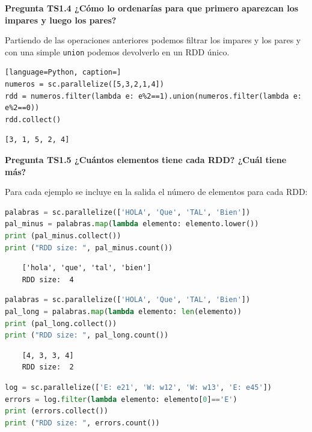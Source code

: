 \documentclass[10pt,swedish, openany]{book}
\begin{document}
\vspace{0.8em}

\textbf{Pregunta TS1.4 ¿Cómo lo ordenarías para que primero aparezcan los impares y luego los pares?}

Partiendo de las operaciones anteriores podemos filtrar los impares y los pares y con una simple \texttt{union} podemos devolverlo en un RDD único.

\begin{lstlisting}[language=Python, caption=]
numeros = sc.parallelize([5,3,2,1,4])
rdd = numeros.filter(lambda e: e%2==1).union(numeros.filter(lambda e: e%2==0))
rdd.collect()
\end{lstlisting}
\begin{verbatim}
[3, 1, 5, 2, 4]
\end{verbatim}

\vspace{0.8em}

\textbf{Pregunta TS1.5 ¿Cuántos elementos tiene cada RDD? ¿Cuál tiene más?}

Para cada ejemplo se incluye en la salida el número de elementos para cada RDD:

\begin{lstlisting}[language=Python, caption=Ejemplo 1 TS1.5]
palabras = sc.parallelize(['HOLA', 'Que', 'TAL', 'Bien'])
pal_minus = palabras.map(lambda elemento: elemento.lower())
print (pal_minus.collect())
print ("RDD size: ", pal_minus.count())
\end{lstlisting}

\begin{verbatim}
    ['hola', 'que', 'tal', 'bien']
    RDD size:  4
\end{verbatim}

\begin{lstlisting}[language=Python, caption=Ejemplo 2 TS1.5]
palabras = sc.parallelize(['HOLA', 'Que', 'TAL', 'Bien'])
pal_long = palabras.map(lambda elemento: len(elemento))
print (pal_long.collect())
print ("RDD size: ", pal_long.count())
\end{lstlisting}

\begin{verbatim}
    [4, 3, 3, 4]
    RDD size:  2
\end{verbatim}

\begin{lstlisting}[language=Python, caption=Ejemplo 3 TS1.5]
log = sc.parallelize(['E: e21', 'W: w12', 'W: w13', 'E: e45'])
errors = log.filter(lambda elemento: elemento[0]=='E')
print (errors.collect())
print ("RDD size: ", errors.count())
\end{lstlisting}
\end{document}

